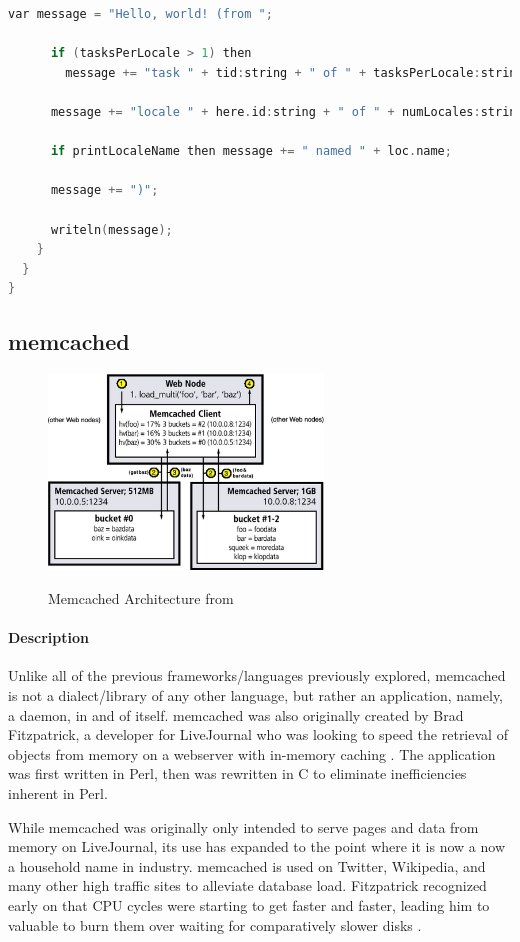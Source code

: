 {\begin{lstlisting}[language=C++, caption=Hello World in Chapel, captionpos=b]
      var message = "Hello, world! (from ";

      if (tasksPerLocale > 1) then
        message += "task " + tid:string + " of " + tasksPerLocale:string + " on ";

      message += "locale " + here.id:string + " of " + numLocales:string;

      if printLocaleName then message += " named " + loc.name;

      message += ")";

      writeln(message);
    }
  }
}
	\end{lstlisting}

\subsection{memcached}
    \begin{figure}[h]
		\centering
		\includegraphics[width=0.65\textwidth]{Figures/memcached_arch.jpg}
		\label{fig:memcached_arch}
		\caption{Memcached Architecture from \cite{memcached_linux}}
    \end{figure}
	\paragraph{Description}
	Unlike all of the previous frameworks/languages previously explored, memcached is not a dialect/library of any other language, but rather an application, namely, a daemon, in and of itself. memcached was also originally created by Brad Fitzpatrick, a developer for LiveJournal who was looking to speed the retrieval of objects from memory on a webserver with in-memory caching \cite{lj_dev}. The application was first written in Perl, then was rewritten in C to eliminate inefficiencies inherent in Perl. 

	While memcached was originally only intended to serve pages and data from memory on LiveJournal, its use has expanded to the point where it is now a now a household name in industry. memcached is used on Twitter, Wikipedia, and many other high traffic sites to alleviate database load. Fitzpatrick recognized early on that CPU cycles were starting to get faster and faster, leading him to valuable to burn them over waiting for comparatively slower disks \cite{memcached_linux}. 

}
